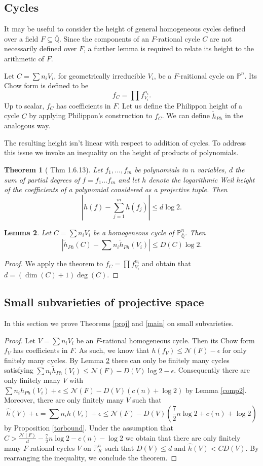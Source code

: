 \documentclass[11pt, a4paper, UKenglish]{amsart}
\newcommand{\N}{\mathcal N}
\newcommand{\Qbar}{\bar{\mathbb{Q}}}
\newcommand{\bbP}{\mathbb{P}}
\newcommand{\eqn}[1]{\begin{equation*}#1\end{equation*}}
\newtheorem{thm_}{Theorem}[section]
\newtheorem{lemma_}[thm_]{Lemma}
\theoremstyle{definition}
\newcommand{\thm}[1]{\begin{thm_}#1\end{thm_}}
\newcommand{\lemm}[1]{\begin{lemma_}#1\end{lemma_}}
\newcommand{\pf}[1]{\begin{proof}#1\end{proof}}
\begin{document}
\subsection{\label{cycles}Cycles}

It may be useful to consider the height of general homogeneous cycles defined over a field $F\subseteq \Qbar$. Since the components of an $F$-rational cycle $C$ are not necessarily defined over $F$, a further lemma is required to relate its height to the arithmetic of $F$.

Let $C = \sum n_i V_i$, for geometrically irreducible $V_i$, be a $F$-raitional cycle on $\bbP^n$. Its Chow form is defined to be \eqn{ f_C = \prod f^{n_i}_{V_i}.}
Up to scalar, $f_C$ has coefficients in $F$. Let us define the Philippon height of a cycle $C$ by applying Philippon's construction to $f_C$. We can define $\tilde{h}_{Ph}$ in the analogous way.

The resulting height isn't linear with respect to addition of cycles. To address this issue we invoke an inequality on the height of products of polynomials.

\thm{[\cite{bombgubler} Thm 1.6.13] Let $f_1,\dots,f_m$ be polynomials in $n$ variables, $d$ the sum of partial degrees of $f = f_1\dots f_m$ and let $h$ denote the logarithmic Weil height of the coefficients of a polynomial considered as a projective tuple. Then
\eqn{|h(f)-\sum^m_{j=1} h(f_j)| \leq d\log{2}.}
}

\lemm{\label{cycles}Let $C=\sum n_i V_i$ be a homogeneous cycle of $\bbP_{\Qbar}^n$. Then
\eqn{|\tilde{h}_{Ph}(C) - \sum n_i \tilde{h}_{Ph}(V_i)| \leq D(C)\log 2 .}
}

\pf{We apply the theorem to $f_C = \prod f^{n_i}_{V_i}$ and obtain that $d = (\dim(C) +1)\deg(C)$.}

\subsection{Small subvarieties of projective space}
In this section we prove Theorems \ref{proj} and \ref{main} on small subvarieties.


\proj*

\pf{Let $V=\sum n_i V_i$ be an $F$-rational homogeneous cycle. Then its Chow form $f_V$ has coefficients in $F$. As such, we know that $h(f_V) \leq \N(F)-\epsilon$ for only finitely many cycles. By Lemma \ref{cycles} there can only be finitely many cycles satisfying $\sum n_i \tilde{h}_{Ph}(V_i) \leq \N(F)- D(V)\log 2 -\epsilon$. Consequently there are only finitely many $V$ with $\sum n_i h_{Ph}(V_i)+ \epsilon \leq \N(F) - D(V)\left(c(n) + \log 2 \right)$ by Lemma \ref{comp2}. Moreover, there are only finitely many $V$ such that 
\eqn{\hat{h}(V)+ \epsilon= \sum n_i \hat{h}(V_i)+ \epsilon \leq \N(F) - D(V)\left(\frac{7}{2}n \log 2  +c(n) + \log 2 \right)} by Proposition \ref{torbound}. Under the assumption that $C > \frac{\N(F)}{d} -\frac{7}{2}n \log 2 - c(n)-\log 2$ we obtain that there are only finitely many $F$-rational cycles $V$ on $\bbP^n_K$ such that $D(V) \leq d$ and $\hat{h}(V) < CD(V)$. By rearranging the inequality, we conclude the theorem.
}
\end{document}
